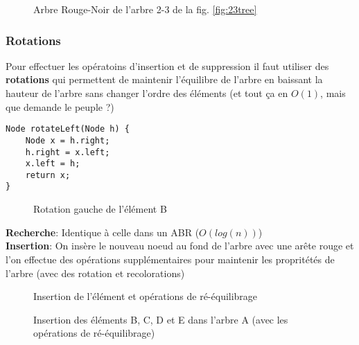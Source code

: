 \documentclass[10pt]{article}
\begin{document}
\begin{figure}[H]
\caption{Arbre Rouge-Noir de l'arbre 2-3 de la fig. \ref{fig:23tree}}
\label{fig:balanced_tree}
\end{figure}

\subsubsection{Rotations}
Pour effectuer les opératoins d'insertion et de suppression il faut utiliser des \textbf{rotations} qui permettent de maintenir l'équilibre de l'arbre en baissant la hauteur de l'arbre sans changer l'ordre des éléments
 (et tout ça en $O(1)$, mais que demande le peuple ?)
\begin{multicols}{2}
\begin{verbatim}
Node rotateLeft(Node h) {
	Node x = h.right;
	h.right = x.left;
	x.left = h;
	return x;
}
\end{verbatim}

\begin{figure}[H]
\caption{Rotation gauche de l'élément B}
\label{fig:balanced_tree}
\end{figure}
\end{multicols}

\textbf{Recherche}: Identique à celle dans un ABR ($O(log(n))$)
\\\textbf{Insertion}: On insère le nouveau noeud au fond de l'arbre avec une arête rouge et l'on effectue des opérations supplémentaires pour maintenir les propritétés de l'arbre (avec des rotation et recolorations)
\begin{figure}[H]
\caption{Insertion de l'élément et opérations de ré-équilibrage}
\label{fig:RN_insert}
\end{figure}

\begin{figure}[H]
\caption{Insertion des éléments B, C, D et E dans l'arbre A (avec les opérations de ré-équilibrage)}
\label{fig:RN_construct}
\end{figure}
\end{document}

